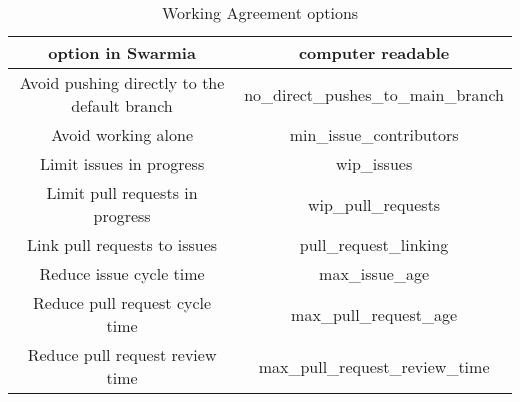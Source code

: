 \begin{table}[h!]
\centering
\begin{tabular}{ |c|c| } 
\hline
option in Swarmia & computer readable \\ [0.5ex] 
\hline\hline
Avoid pushing directly to the default branch & no\_direct\_pushes\_to\_main\_branch \\
Avoid working alone & min\_issue\_contributors  \\
Limit issues in progress & wip\_issues  \\
Limit pull requests in progress & wip\_pull\_requests \\
Link pull requests to issues & pull\_request\_linking  \\
Reduce issue cycle time & max\_issue\_age  \\
Reduce pull request cycle time & max\_pull\_request\_age \\
Reduce pull request review time & max\_pull\_request\_review\_time  \\
\hline
\end{tabular}
\caption{Working Agreement options}
\label{table:workingAgreements}
\end{table}